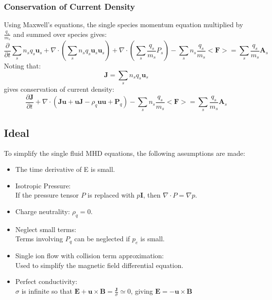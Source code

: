 \subsubsection{Conservation of Current Density}
Using Maxwell's equations, the single species momentum
equation multiplied by $\frac{q_s}{m_s}$ and summed over species
gives:
$$ \frac{\partial}{\partial t} \sum_s n_s q_s \mathbf{u}_s + \nabla \cdot
(\sum_s n_s q_s \mathbf{u}_s \mathbf{u}_s) + \nabla \cdot (\sum_s
\frac{q_s}{m_s} P_s) - \sum_s n_s \frac{q_s}{m_s} < \mathbf{F} > = \sum_s
\frac{q_s}{m_s} \mathbf{A}_s$$ Noting that:
$$ \mathbf{J} = \sum_s n_s q_s \mathbf{u}_s $$
gives conservation of current density:
\begin{equation}
\frac{\partial \mathbf{J}}{\partial t} + \nabla \cdot (\mathbf{J u} + \mathbf{u J} 
- \rho_q \mathbf{uu} + \mathbf{P}_q) - \sum_s n_s \frac{q_s}{m_s} < \mathbf{F}
> = \sum_s \frac{q_s}{m_s} \mathbf{A}_s
\end{equation}

\subsection{Ideal}
To simplify the single fluid MHD equations, the following
assumptions are made:
\begin{itemize}
\item The time derivative of E is small.
\item Isotropic Pressure: \\
If the pressure tensor $P$ is replaced with $p\mathbf{I}$, then $\nabla \cdot P
= \nabla p$.
\item Charge neutrality: $\rho_q = 0$.
\item Neglect small terms: \\
Terms involving $P_q$ can be neglected if $p_e$ is small.
\item Single ion flow with collision term approximation: \\
Used to simplify the magnetic field differential equation.
\item Perfect conductivity: \\
$\sigma$ is infinite so that $\mathbf{E} + \mathbf{u} \times \mathbf{B} =
\frac{\mathbf{J}}{\sigma} \simeq 0$, giving $\mathbf{E} = - \mathbf{u} \times
\mathbf{B}$
\end{itemize}

